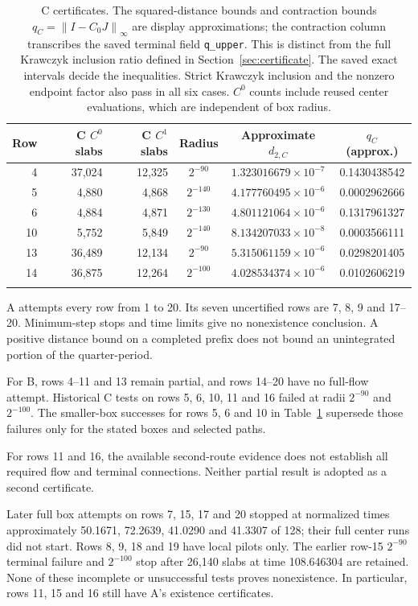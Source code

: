 \documentclass[10pt,a4paper]{article}
\theoremstyle{remark}
\newcommand{\norm}[1]{\left\lVert #1\right\rVert_\infty}
\begin{document}
\begin{longtable}{@{}rrrccc@{}}
\toprule
Row & C $C^0$ slabs & C $C^1$ slabs & Radius & Approximate $d_{2,C}$ & $q_C$ (approx.)\\
\midrule
4 & 37,024 & 12,325 & $2^{-90}$ & $1.323016679\times10^{-7}$ & 0.1430438542\\
5 & 4,880 & 4,868 & $2^{-140}$ & $4.177760495\times10^{-6}$ & 0.0002962666\\
6 & 4,884 & 4,871 & $2^{-130}$ & $4.801121064\times10^{-6}$ & 0.1317961327\\
10 & 5,752 & 5,849 & $2^{-140}$ & $8.134207033\times10^{-8}$ & 0.0003566111\\
13 & 36,489 & 12,134 & $2^{-90}$ & $5.315061159\times10^{-6}$ & 0.0298201405\\
14 & 36,875 & 12,264 & $2^{-100}$ & $4.028534374\times10^{-6}$ & 0.0102606219\\
\bottomrule
\caption{C certificates. The squared-distance bounds and contraction
bounds $q_C=\norm{I-C_0J}$ are display approximations; the contraction
column transcribes the saved terminal field \texttt{q\_upper}. This is
distinct from the full Krawczyk inclusion ratio defined in
Section~\ref{sec:certificate}. The saved exact intervals decide the
inequalities. Strict Krawczyk inclusion and the
nonzero endpoint factor also pass in all six cases. $C^0$ counts
include reused center evaluations, which are independent of box radius.}
\label{tab:capd}
\end{longtable}
\endgroup

A attempts every row from 1 to 20. Its seven uncertified rows are
7, 8, 9 and 17--20. Minimum-step stops and time limits give no
nonexistence conclusion. A positive distance bound on a completed
prefix does not bound an unintegrated portion of the quarter-period.

For B, rows 4--11 and 13 remain partial, and rows 14--20 have no
full-flow attempt. Historical C tests on rows 5, 6, 10, 11 and 16 failed
at radii $2^{-90}$ and $2^{-100}$. The smaller-box successes for rows
5, 6 and 10 in Table~\ref{tab:capd} supersede those failures only for
the stated boxes and selected paths.

For rows 11 and 16, the available second-route evidence does not establish
all required flow and terminal connections. Neither partial result is
adopted as a second certificate.

Later full box attempts on rows 7, 15, 17 and 20 stopped at normalized
times approximately 50.1671, 72.2639, 41.0290 and 41.3307 of 128;
their full center runs did not start. Rows 8, 9, 18 and 19 have local
pilots only. The earlier row-15 $2^{-90}$ terminal failure and
$2^{-100}$ stop after 26,140 slabs at time 108.646304 are retained.
None of these incomplete or unsuccessful tests proves nonexistence.
In particular, rows 11, 15 and 16 still have A's existence certificates.
\end{document}
